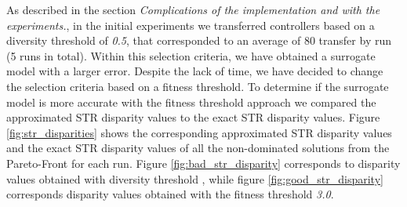 As described in the section \emph{Complications of the implementation and with the experiments.}, in the initial experiments we transferred controllers based on a diversity threshold of \textit{0.5}, that corresponded to an average of 80 transfer by run (5 runs in total). Within this selection criteria, we have obtained a surrogate model with a larger error. Despite the lack of time, we have decided to change the selection criteria based on a fitness threshold. To determine if the surrogate model is more accurate with the fitness threshold approach we compared the approximated STR disparity values to the exact STR disparity values. Figure \ref{fig:str_disparities} shows the corresponding approximated STR disparity values and the exact STR disparity values of all the non-dominated solutions from the Pareto-Front for each run. Figure \ref{fig:bad_str_disparity} corresponds to disparity values obtained with diversity threshold , while figure \ref{fig:good_str_disparity} corresponds disparity values obtained with the fitness threshold \textit{3.0}.

